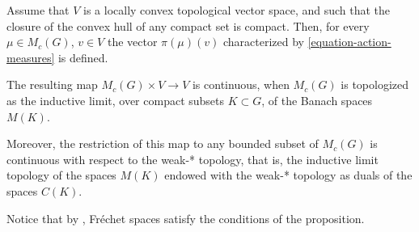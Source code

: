 \begin{proposition}
\label{proposition-integral-lcs}
 Assume that $V$ is a locally convex topological vector space, and such that the closure of the convex hull of any compact set is compact. Then, for every $\mu\in M_c(G)$, $v\in V$ the vector $\pi(\mu)(v)$ characterized by \eqref{equation-action-measures} is defined. 
 
 The resulting map $M_c(G)\times V \to V$ is continuous, when $M_c(G)$ is topologized as the inductive limit, over compact subsets $K\subset G$, of the Banach spaces $M(K)$. 
 
 Moreover, the restriction of this map to any bounded subset of $M_c(G)$ is continuous with respect to the weak-* topology, that is, the inductive limit topology of the spaces $M(K)$ endowed with the weak-* topology as duals of the spaces $C(K)$.
\end{proposition}

Notice that by \cite[Theorem 3.20]{Rudin}, Fr\'echet spaces satisfy the conditions of the proposition.

